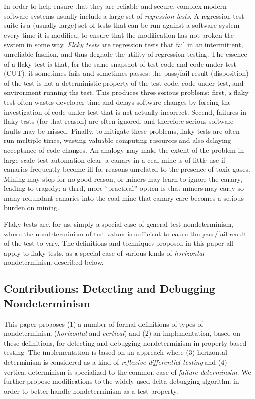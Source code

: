In order to help ensure that they are reliable and secure, complex
modern software systems usually include a large set of
\emph{regression tests}.  A regression test suite is a (usually large)
set of tests that can be run against a software system every time it
is modified, to ensure that the modification has not broken the system
in some way.  \emph{Flaky tests} \cite{miccoflaky} are regression
tests that fail in an intermittent, unreliable fashion, and thus
degrade the utility of regression testing.  The essence of a flaky
test is that, for the same snapshot of test code and code under test
(CUT), it sometimes fails and sometimes passes: the pass/fail result (disposition) of the
test is not a deterministic property of the test code, code under
test, and environment running the test.  This produces three serious
problems: first, a flaky test often wastes developer time and delays
software changes by forcing the investigation of code-under-test that
is not actually incorrect.  Second, failures in flaky tests (for that
reason) are often ignored, and therefore serious software faults may
be missed.  Finally, to mitigate these problems, flaky tests are often
run multiple times, wasting valuable computing resources and also
delaying acceptance of code changes.  An analogy may make the extent
of the problem in large-scale test automation clear:  a canary in a coal mine is of
little use if canaries frequently become ill for reasons unrelated to
the presence of toxic gases.  Mining may stop for no good reason, or
miners may learn to ignore the canary, leading to tragedy; a third,
more ``practical'' option is that miners may carry so many redundant
canaries into the coal mine that canary-care becomes a serious burden
on mining.

Flaky tests are, for us, simply a special case of general test
nondeterminism, where the nondeterminism of test values is sufficient
to cause the pass/fail result of the test to vary.  The definitions
and techniques proposed in this paper all apply to flaky tests, as a
special case of various kinds of \emph{horizontal} nondeterminism described below.

\subsection{Contributions:  Detecting and Debugging Nondeterminism}


This paper proposes (1) a number of formal definitions of types of
nondeterminism (\emph{horizontal} and \emph{vertical}) and (2) an implementation, based on these definitions, for detecting and debugging
nondeterminism in property-based testing.  The implementation is based
on an approach where (3) horizontal determinism is considered as a
kind of \emph{reflexive differential testing} and (4) vertical
determinism is specialized to the common case of \emph{failure determinsim}.
We further propose modifications to the widely used delta-debugging algorithm in order to better handle
nondeterminism as a test property.

